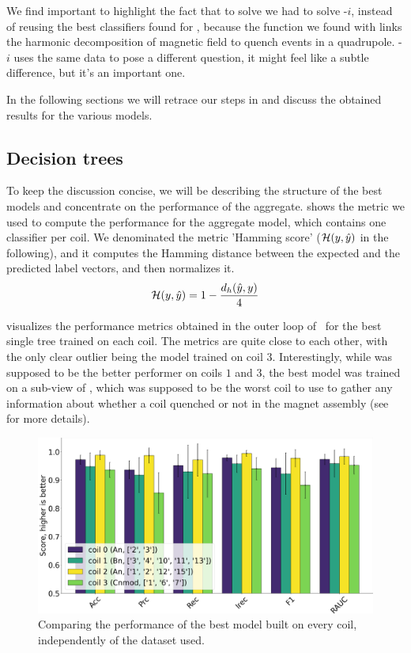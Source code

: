 \smallskip

We find important to highlight the fact that to solve \qlp we had to solve \qrp-$i$, instead of
reusing the best classifiers found for \qrp, because the function we found with \qrp links the
harmonic decomposition of magnetic field to quench events in a quadrupole. \qrp-$i$ uses the same
data to pose a different question, it might feel like a subtle difference, but it's an important
one.

In the following sections we will retrace our steps in  and discuss the obtained results for the various models.

\subsection{Decision trees}
To keep the discussion concise, we will be describing the structure of the best models and
concentrate on the performance of the aggregate.  shows the metric we used to
compute the performance for the aggregate model, which contains one classifier per coil. We
denominated the metric 'Hamming score' ($\mathcal{H}(y, \hat{y})$ in the following), and it computes the Hamming
distance between the expected and the predicted label vectors, and then normalizes it.
\begin{equation}
	\label{eq:hamming}
	\mathcal{H}(y, \hat{y}) = 1 - \frac{d_h(\hat{y}, y)}{4}
\end{equation}

 visualizes the performance metrics obtained in the outer loop of \ncv\ for the best single
tree trained on each coil. The metrics are quite close to each other, with the only clear outlier
being the model trained on coil $3$. Interestingly, while \bn was supposed to be the better
performer on coils $1$ and $3$, the best model was trained on a sub-view of \cnmod, which was
supposed to be the worst coil to use to gather any information about whether a coil quenched or not
in the magnet assembly (see  for more details).
\begin{figure}[!ht]
	\centering
	\includegraphics[width=0.7\linewidth]{img/best_dts_qlp.png}
	\caption{Comparing the performance of the best model built on every coil, independently of
		the dataset used.} \label{fig:bdts-qlp}
\end{figure}

